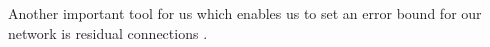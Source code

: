 Another important tool for us which enables us to set an error bound for our network is residual connections \cite{he2016deep}.\\
























